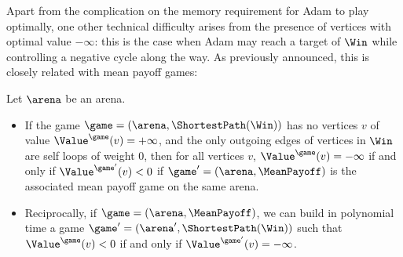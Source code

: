 Apart from the complication on the memory requirement for Adam to play
optimally, one other technical difficulty arises from the presence of
vertices with optimal value $-\infty$: this is the case when Adam may
reach a target of $\Win$ while controlling a negative cycle along the
way. As previously announced, this is closely related with mean payoff
games:
\begin{theorem}\label{4-thm:-infty-MP}
  Let $\arena$ be an arena.
  \begin{itemize}
  \item If the game $\game=(\arena,\ShortestPath(\Win))$ has no
    vertices $v$ of value $\Value^\game(v)=+\infty$, and the only
    outgoing edges of vertices in $\Win$ are self loops of weight $0$,
    then for all vertices $v$, $\Value^\game(v)=-\infty$ if and only
    if $\Value^{\game'}(v)<0$ if $\game'=(\arena,\MeanPayoff)$ is the
    associated mean payoff game on the same arena.
  \item Reciprocally, if $\game=(\arena,\MeanPayoff)$, we can build in
    polynomial time a game $\game'=(\arena',\ShortestPath(\Win))$ such
    that $\Value^\game(v)<0$ if and only if
    $\Value^{\game'}(v) =-\infty$.
  \end{itemize}
\end{theorem}
